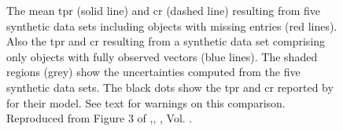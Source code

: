 \begin{figure}[ht!]
\begin{center}
\caption{The mean \gls{tpr} (solid line) and \gls{cr} (dashed line) resulting from five synthetic data sets including objects with missing entries (red lines). Also the \gls{tpr} and \gls{cr} resulting from a synthetic data set comprising only objects with fully observed vectors (blue lines). The shaded regions (grey) show the uncertainties computed from the five synthetic data sets. The black dots show the \gls{tpr} and \gls{cr} reported by \citet{Sarro2014} for their model. See text for warnings on this comparison. Reproduced from Figure 3 of \citet{Olivares2017},\textit{}, , Vol. .}
\label{fig:TPR-CR}
\end{center}
\end{figure}

